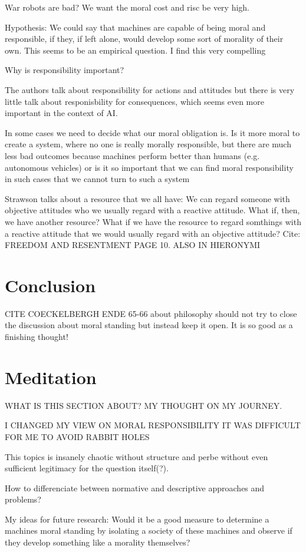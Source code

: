 \documentclass{article}
\begin{document}
War robots are bad? We want the moral cost and risc be very high.

Hypothesis: We could say that machines are capable of being moral and
responsible, if they, if left alone, would develop some sort of morality of
their own. This seems to be an empirical question. I find this very compelling

Why is responsibility important?

The authors talk about responsibility for actions and attitudes but there is
very little talk about responisbility for consequences, which seems even more
important in the context of AI.

In some cases we need to decide what our moral obligation is. Is it more moral
to create a system, where no one is really morally responsible, but there are
much less bad outcomes because machines perform better than humans (e.g.
autonomous vehicles) or is it so important that we can find moral responsibility
in such cases that we cannot turn to such a system

Strawson talks about a resource that we all have: We can regard someone with
objective attitudes who we usually regard with a reactive attitude. What if,
then, we have another resource? What if we have the resource to regard somthings
with a reactive attitude that we would usually regard with an objective
attitude? Cite: FREEDOM AND RESENTMENT PAGE 10. ALSO IN HIERONYMI
\section{Conclusion}

CITE COECKELBERGH ENDE 65-66 about philosophy should not try to close the
discussion about moral standing but instead keep it open. It is so good as a
finishing thought!
\section{Meditation}
WHAT IS THIS SECTION ABOUT?
MY THOUGHT ON MY JOURNEY.

I CHANGED MY VIEW ON MORAL RESPONSIBILITY
IT WAS DIFFICULT FOR ME TO AVOID RABBIT HOLES

This topics is insanely chaotic without structure and perbe without even
sufficient legitimacy for the question itself(?).

How to differenciate between normative and descriptive approaches and problems?

My ideas for future research: Would it be a good measure to determine a machines
moral standing by isolating a society of these machines and observe if they
develop something like a morality themselves?
\end{document}
